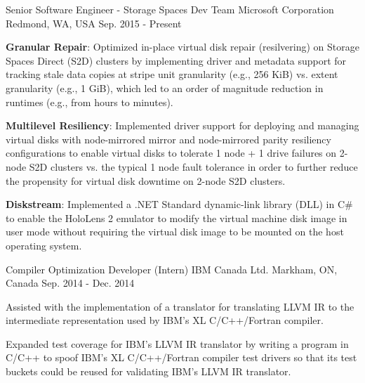 

\begin{cventries}

  \cventry
    {Senior Software Engineer - Storage Spaces Dev Team} %
    {Microsoft Corporation} %
    {Redmond, WA, USA} %
    {Sep. 2015 - Present} %
    {
      \begin{cvitems} %
        \item {
          \textbf{Granular Repair}: Optimized in-place virtual disk repair (resilvering) on Storage
          Spaces Direct (S2D) clusters by implementing driver and metadata support for tracking
          stale data copies at stripe unit granularity (e.g., 256 KiB) vs. extent granularity
          (e.g., 1 GiB), which led to an order of magnitude reduction in runtimes (e.g., from hours
          to minutes).
        }
        \item {
          \textbf{Multilevel Resiliency}: Implemented driver support for deploying and managing virtual
          disks with node-mirrored mirror and node-mirrored parity resiliency configurations to
          enable virtual disks to tolerate 1 node + 1 drive failures on 2-node S2D clusters vs. the
          typical 1 node fault tolerance in order to further reduce the propensity for virtual disk
          downtime on 2-node S2D clusters.
        }
        \item {
          \textbf{Diskstream}: Implemented a .NET Standard dynamic-link library (DLL) in C\# to
          enable the HoloLens 2 emulator to modify the virtual machine disk image in user mode
          without requiring the virtual disk image to be mounted on the host operating system.
        }
      \end{cvitems}
    }

  \cventry
    {Compiler Optimization Developer (Intern)} %
    {IBM Canada Ltd.} %
    {Markham, ON, Canada} %
    {Sep. 2014 - Dec. 2014} %
    {
      \begin{cvitems} %
        \item {
          Assisted with the implementation of a translator for translating LLVM IR to
          the intermediate representation used by IBM's XL C/C++/Fortran compiler.
        }
        \item {
          Expanded test coverage for IBM's LLVM IR translator by writing a program in
          C/C++ to spoof IBM's XL C/C++/Fortran compiler test drivers so that its test
          buckets could be reused for validating IBM's LLVM IR translator.
        }
      \end{cvitems}
    }


\end{cventries}
